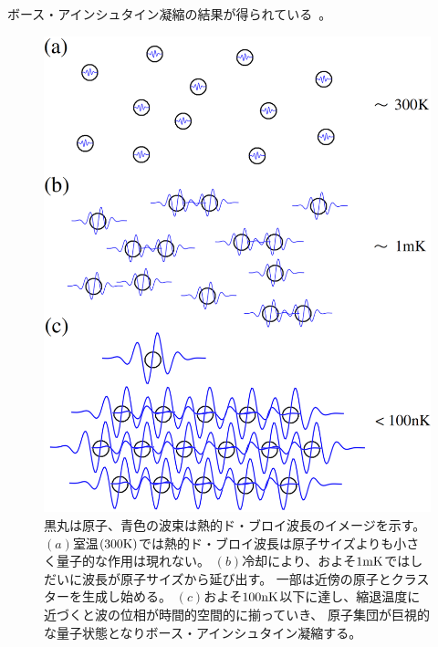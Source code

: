 \documentclass[12pt,a4paper]{jbook}
\begin{document}
        ボース・アインシュタイン凝縮の結果が得られている~\cite{Anderson}。
		\begin{figure}[H]
			\begin{center}
				\includegraphics[width=11.5cm]{bec.eps}
				\caption{
                    黒丸は原子、青色の波束は熱的ド・ブロイ波長のイメージを示す。
                    $(a)$室温$(300{\rm K})$では熱的ド・ブロイ波長は原子サイズよりも小さく量子的な作用は現れない。
                    $(b)$冷却により、およそ$1{\rm mK}$ではしだいに波長が原子サイズから延び出す。
                    一部は近傍の原子とクラスターを生成し始める。
                    $(c)$およそ$100{\rm nK}$以下に達し、縮退温度に近づくと波の位相が時間的空間的に揃っていき、
                    原子集団が巨視的な量子状態となりボース・アインシュタイン凝縮する。
				}
				\label{FIG:bec}
			\end{center}
		\end{figure}
\end{document}
